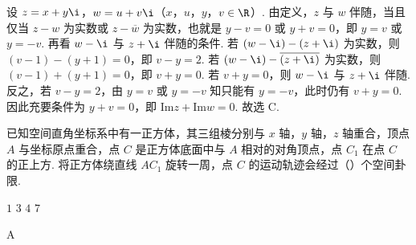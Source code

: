 \documentclass[UTF8,a4paper,oneside,11pt]{ctexbook}
\begin{document}
\begin{solution}
设 \( z=x+y\i \)，\( w=u+v\i \)（\(x\)，\(u\)，\(y\)，\(v\in\R\)）.
由定义，\( z \) 与 \( w \) 伴随，当且仅当 \( z-w \) 为实数或 \( z-\overline{w} \) 为实数，也就是 \( y-v=0 \) 或 \( y+v=0 \)，即 \( y=v \) 或 \( y=-v \).
再看 \( w-\i \) 与 \( z+\i \) 伴随的条件. 若 \( \left( w-\i \right)-\left( z+\i \right) \) 为实数，则 \( \left( v-1 \right)-\left( y+1 \right)=0 \)，即 \( v-y=2 \). 若 \( \left( w-\i \right)-\overline{\left( z+\i \right)} \) 为实数，则 \( \left( v-1 \right)+\left( y+1 \right)=0 \)，即 \( v+y=0 \).
若 \( v+y=0 \)，则 \( w-\i \) 与 \( z+\i \) 伴随. 反之，若 \( v-y=2 \)，由 \( y=v \) 或 \( y=-v \) 知只能有 \( y=-v \)，此时仍有 \( v+y=0 \). 因此充要条件为 \( y+v=0 \)，即 \( \mathrm{Im} z+\mathrm{Im} w=0 \). 故选 C.
\end{solution}

\begin{problem}
已知空间直角坐标系中有一正方体，其三组棱分别与 \( x \) 轴，\( y \) 轴，\( z \) 轴重合，顶点 \(A\) 与坐标原点重合，点 \(C\) 是正方体底面中与 \(A\) 相对的对角顶点，点 \(C_1\) 在点 \(C\) 的正上方. 将正方体绕直线 \(AC_1\) 旋转一周，点 \(C\) 的运动轨迹会经过（\quad）个空间卦限.


\choices
    {\(1\)}
    {\(3\)}
    {\(4\)}
    {\(7\)}
\end{problem}

\begin{answer}
A
\end{answer}
\end{document}
